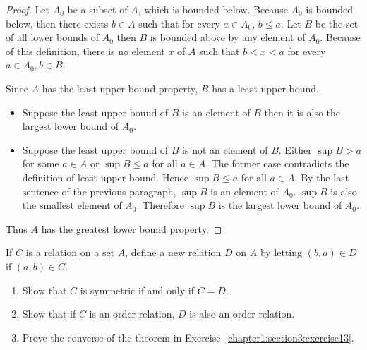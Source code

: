 \begin{proof}
    Let $A_{0}$ be a subset of $A$, which is bounded below. Because $A_{0}$ is bounded below, then there exists $b\in A$ such that for every $a\in A_{0}$, $b\leq a$. Let $B$ be the set of all lower bounds of $A_{0}$ then $B$ is bounded above by any element of $A_{0}$. Because of this definition, there is no element $x$ of $A$ such that $b < x < a$ for every $a\in A_{0}, b\in B$.

    Since $A$ has the least upper bound property, $B$ has a least upper bound.
    \begin{itemize}
        \item Suppose the least upper bound of $B$ is an element of $B$ then it is also the largest lower bound of $A_{0}$.
        \item Suppose the least upper bound of $B$ is not an element of $B$. Either $\sup B > a$ for some $a\in A$ or $\sup B\leq a$ for all $a\in A$. The former case contradicts the definition of least upper bound. Hence $\sup B\leq a$ for all $a\in A$. By the last sentence of the previous paragraph, $\sup B$ is an element of $A_{0}$. $\sup B$ is also the smallest element of $A_{0}$. Therefore $\sup B$ is the largest lower bound of $A_{0}$.
    \end{itemize}

    Thus $A$ has the greatest lower bound property.
\end{proof}

\begin{exercise}\label{chapter1:section3:exercise14}
    If $C$ is a relation on a set $A$, define a new relation $D$ on $A$ by letting $(b, a)\in D$ if $(a, b)\in C$.
    \begin{enumerate}[label={(\alph*)}]
        \item Show that $C$ is symmetric if and only if $C = D$.
        \item Show that if $C$ is an order relation, $D$ is also an order relation.
        \item Prove the converse of the theorem in Exercise~\ref{chapter1:section3:exercise13}.
    \end{enumerate}
\end{exercise}

